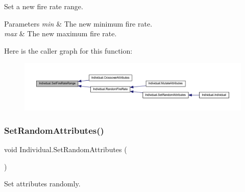 Set a new fire rate range. 


\begin{DoxyParams}{Parameters}
{\em min} & The new minimum fire rate.\\
\hline
{\em max} & The new maximum fire rate.\\
\hline
\end{DoxyParams}
Here is the caller graph for this function\+:\nopagebreak
\begin{figure}[H]
\begin{center}
\leavevmode
\includegraphics[width=350pt]{class_individual_ab9a068a2aeac06fc33a22391dba7559a_icgraph}
\end{center}
\end{figure}
\mbox{\label{class_individual_aad9008e000af2bf09346be0ca9258116}} 
\subsubsection{\texorpdfstring{Set\+Random\+Attributes()}{SetRandomAttributes()}}
{\footnotesize\ttfamily void Individual.\+Set\+Random\+Attributes (\begin{DoxyParamCaption}{ }\end{DoxyParamCaption})}



Set attributes randomly. 

